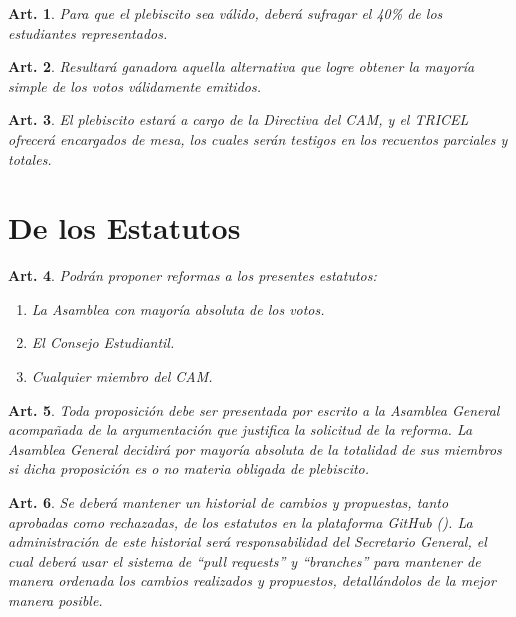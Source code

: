\documentclass[letterpaper,11pt]{article}
\theoremstyle{plain}
\newtheorem{art}{Art.} %
\begin{document}
\begin{art}\label{plebiscitoValidez}
	Para que el plebiscito sea válido, deberá sufragar el 40\% de los estudiantes representados.
\end{art}

\begin{art}\label{}
	Resultará ganadora aquella alternativa que logre obtener la mayoría simple de los votos válidamente emitidos. %
\end{art}

\begin{art}\label{}
	El plebiscito estará a cargo de la Directiva del CAM, y el TRICEL ofrecerá encargados de mesa, los cuales serán testigos en los recuentos parciales y totales. %
\end{art}


\section{De los Estatutos}\label{estatutos}%

\begin{art}\label{}
	Podrán proponer reformas a los presentes estatutos:
	\begin{enumerate}
		\item La Asamblea con mayoría absoluta de los votos.
		\item El Consejo Estudiantil.
		\item Cualquier miembro del CAM.
	\end{enumerate}
\end{art}

\begin{art}\label{}
	Toda proposición debe ser presentada por escrito a la Asamblea General acompañada de la argumentación que justifica la solicitud de la reforma. La Asamblea General decidirá por mayoría absoluta de la totalidad de sus miembros si dicha proposición es o no materia obligada de plebiscito.
\end{art}

\begin{art}\label{}
	Se deberá mantener un historial de cambios y propuestas, tanto aprobadas como rechazadas, de los estatutos en la plataforma GitHub (). La administración de este historial será responsabilidad del Secretario General, el cual deberá usar el sistema de “pull requests” y “branches” para mantener de manera ordenada los cambios realizados y propuestos, detallándolos de la mejor manera posible.
\end{art}
\end{document}
